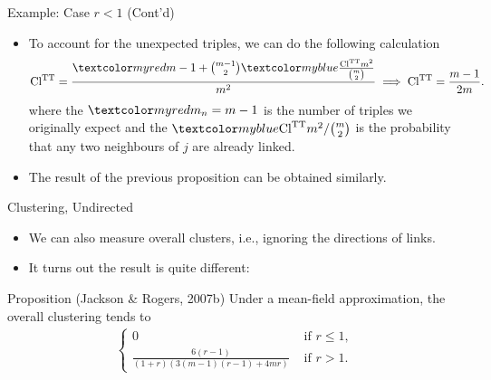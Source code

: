 \documentclass{beamer}
\begin{document}
\begin{frame}{Example: Case $r<1$ (Cont'd)}
	\begin{itemize}
		\item
			To account for the unexpected triples, we can do the following calculation
			\begin{align*}
				\clustertt = \frac{\red{m-1} + {m-1\choose 2}\blue{\frac{\clustertt m^{2}}{{m\choose 2}}}}{m^{2}}
				\implies
				\clustertt = \frac{m-1}{2m}.
			\end{align*}
			where the $\red{m_{n}=m-1}$ is the number of triples we originally expect
			and the $\blue{\clustertt m^{2}/{m\choose 2}}$ is the probability that any two neighbours of $j$ are already linked.
		\item
			The result of the previous proposition can be obtained similarly.
	\end{itemize}
\end{frame}

\begin{frame}{Clustering, Undirected}
	\begin{itemize}
		\item
			We can also measure overall clusters, i.e., ignoring the directions of links.
		\item
			It turns out the result is quite different:
	\end{itemize}
	\begin{block}{Proposition (Jackson \& Rogers, 2007b)}
		Under a mean-field approximation,
		the overall clustering tends to
		\begin{align*}
			\begin{cases}
				0 & \text{ if } r\leq1, \\
				\frac{6(r-1)}{(1+r)(3(m-1)(r-1)+4m r)} & \text{ if } r > 1.
			\end{cases}
		\end{align*}
	\end{block}
\end{frame}
\end{document}
